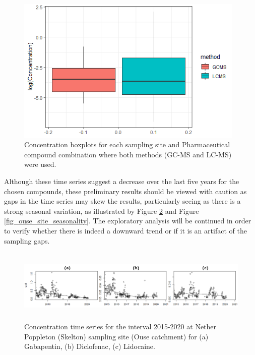 \documentclass{article}
\begin{document}
\begin{figure}[h]
    \centering
    \includegraphics[height=7cm]{fig_boxplots.png}
    \caption{Concentration boxplots for each sampling site and Pharmaceutical compound combination
 where both methods (GC-MS and LC-MS) were used.}
    \label{fig_lc_gc_boxplot}
\end{figure}

Although these time series suggest a decrease over the last five years for the chosen compounds, these preliminary results should be viewed with caution as gaps in the time series may skew the results, particularly seeing as there is a strong seasonal variation, as illustrated by Figure \ref{fig_ouse_site_time_series} and Figure \ref{fig_ouse_site_seasonality}. The exploratory analysis will be continued in order to verify whether there is indeed a downward trend or if it is an artifact of the sampling gaps.

\begin{figure}[h]
    \centering
    \includegraphics[height=3.5cm]{fig_time_series.png}
    \caption{Concentration time series for the interval 2015-2020 at Nether Poppleton (Skelton) sampling site (Ouse catchment) 
for (a) Gabapentin, (b) Diclofenac, (c) Lidocaine.}
    \label{fig_ouse_site_time_series}
\end{figure}
\end{document}
